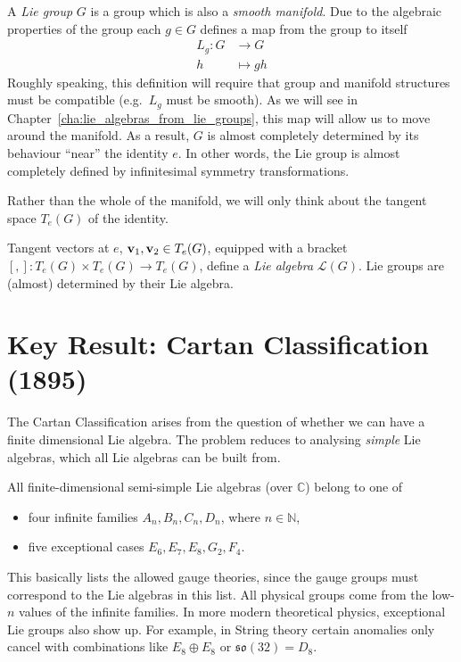 A \emph{Lie group} $G$ is a group which is also a \emph{smooth manifold}.  Due to the algebraic properties of the group each $g \in G$ defines a map from the group to itself
\begin{equation}
  \begin{split}
    L_g \colon G &\to G \\
    h &\mapsto gh
  \end{split}
\end{equation}
Roughly speaking, this definition will require that group and manifold structures must be compatible (e.g.~$L_{g}$ must be smooth).  As we will see in Chapter~\ref{cha:lie_algebras_from_lie_groups}, this map will allow us to move around the manifold. As a result, $G$ is almost completely determined by its behaviour ``near'' the identity $e$.
In other words, the Lie group is almost completely defined by infinitesimal symmetry transformations.

Rather than the whole of the manifold, we will only think about the tangent space $T_e (G)$ of the identity.

Tangent vectors at $e$, $\vb v_1, \vb v_2 \in T_e (G)$, equipped with a bracket $[, ]: T_e(G) \times T_e(G) \rightarrow T_e(G)$, define a \emph{Lie algebra} $\mathscr{L}(G)$.
Lie groups are (almost) determined by their Lie algebra.

\section{Key Result: Cartan Classification (1895)}%
\label{sec:key_result_cartan_classification}

The Cartan Classification arises from the question of whether we can have a finite dimensional Lie algebra. The problem reduces to analysing \emph{simple} Lie algebras, which all Lie algebras can be built from.

\begin{theorem}
  All finite-dimensional semi-simple Lie algebras (over $\mathbb{C}$) belong to one of
  \begin{itemize}
    \item four infinite families $A_n, B_n, C_{n}, D_n$, where $n \in \mathbb{N}$,
    \item five exceptional cases $E_6, E_7, E_8, G_2, F_4$.
  \end{itemize}
\end{theorem}

This basically lists the allowed gauge theories, since the gauge groups must correspond to the Lie algebras in this list. All physical groups come from the low-$n$ values of the infinite families. In more modern theoretical physics, exceptional Lie groups also show up. For example, in String theory certain anomalies only cancel with combinations like $E_8 \oplus E_8$ or $\mathfrak{so}(32) = D_8$.

